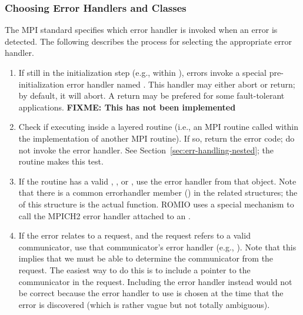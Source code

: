 \documentclass{article}
\def\fixme#1{\marginpar{FIXME:}\textbf{FIXME: #1}}
\begin{document}
\subsubsection{Choosing Error Handlers and Classes}
\label{sec:chosing-errhandler}

The MPI standard specifies which error handler is invoked when an error is
detected.  The following describes the process for selecting the appropriate
error handler.

\begin{enumerate}
\item If still in the initialization step (e.g., within
), errors invoke a special pre-initialization error
handler named .  This handler may either abort or
return; by default, it will abort. 
A return may be prefered for some fault-tolerant applications.
\fixme{This has not been implemented}

\item Check if executing inside a layered routine (i.e., an MPI routine called
  within the implementation of another MPI routine).  If so, return
  the error
  code; do not invoke the error handler.  See
  Section~\ref{sec:err-handling-nested}; the  routine
  makes this test.

\item If the routine has a valid , , or
  , use the error handler from that object.  Note that there is
  a common errorhandler member () in the related structures;
  the  of this structure is the actual function.
  ROMIO uses a special mechanism to call the MPICH2 error handler
  attached to an .

\item If the error relates to a request, and the request refers to a valid
  communicator, use that communicator's error handler (e.g., ).
  Note that this implies that we must be able to determine the communicator
  from the request.  The easiest way to do this is to include a
  pointer to the communicator in the request.  Including the error
  handler instead would not be correct because the error handler to
  use is chosen at the time that the error is discovered (which is
  rather vague but not totally ambiguous).



\end{enumerate}
\end{document}
